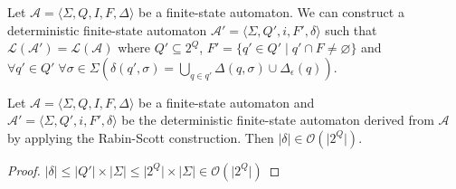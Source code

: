 \begin{theorem}
	Let $\mathcal{A} = \langle \Sigma, Q, I, F, \Delta \rangle$ be a finite-state automaton. We can construct a deterministic finite-state automaton $\mathcal{A'} = \langle \Sigma, Q', i, F', \delta \rangle$ such that $\mathcal{L} ( \mathcal{A'} ) = \mathcal{L} ( \mathcal{A} )$ where $Q' \subseteq 2^{Q}$, $F' = \{ q' \in Q' \mid q' \cap F \neq \varnothing \}$ and $\forall q' \in Q'\; \forall \sigma \in \Sigma(\delta(q', \sigma) = \bigcup_{q \in q'} \Delta(q, \sigma) \cup \Delta_\epsilon(q))$.
\end{theorem}

\begin{corollary}
	Let $\mathcal{A} = \langle \Sigma, Q, I, F, \Delta \rangle$ be a finite-state automaton and\\
	$\mathcal{A'} = \langle \Sigma, Q', i, F', \delta \rangle$ be the deterministic finite-state automaton derived from $\mathcal{A}$ by applying the Rabin-Scott construction. Then $\lvert \delta \rvert \in \mathcal{O}(\lvert 2^Q \rvert)$.
\end{corollary}

\begin{proof}
	$\lvert \delta \rvert \leq \lvert Q' \rvert \times \lvert \Sigma \rvert \leq \lvert 2^Q \rvert \times \lvert \Sigma \rvert \in \mathcal{O}(\lvert 2^Q \rvert)$
\end{proof}

